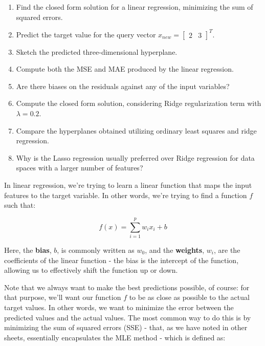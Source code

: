 \documentclass[12pt]{article}
\begin{document}
\begin{enumerate}[leftmargin=\labelsep]
{        \begin{enumerate}
          \item Find the closed form solution for a linear regression, minimizing the
                sum of squared errors.
          \item Predict the target value for the query vector $x_{new} = \begin{bmatrix} 2 & 3 \end{bmatrix}^T$.
          \item Sketch the predicted three-dimensional hyperplane.
          \item Compute both the MSE and MAE produced by the linear regression.
          \item Are there biases on the residuals against any of the input variables?
          \item Compute the closed form solution, considering Ridge regularization term with $\lambda = 0.2$.
          \item Compare the hyperplanes obtained utilizing ordinary least squares and ridge regression.
          \item Why is the Lasso regression usually preferred over Ridge regression for data spaces with a larger number of features?
        \end{enumerate}
        }

        In linear regression, we're trying to learn a linear function that maps the
        input features to the target variable. In other words, we're trying to find
        a function $f$ such that:

        \begin{equation*}
          f(x) = \sum_{i=1}^p w_i x_i + b
        \end{equation*}

        Here, the \textbf{bias}, $b$, is commonly written as $w_0$, and the
        \textbf{weights}, $w_i$, are the coefficients of the linear function - the bias
        is the intercept of the function, allowing us to effectively shift the
        function up or down.

        Note that we always want to make the best predictions possible, of course:
        for that purpose, we'll want our function $f$ to be as close as possible to
        the actual target values. In other words, we want to minimize the error
        between the predicted values and the actual values.
        The most common way to do this is by minimizing the sum of squared errors
        (SSE) - that, as we have noted in other sheets, essentially encapsulates
        the MLE method - which is defined as:


\end{enumerate}
\end{document}
